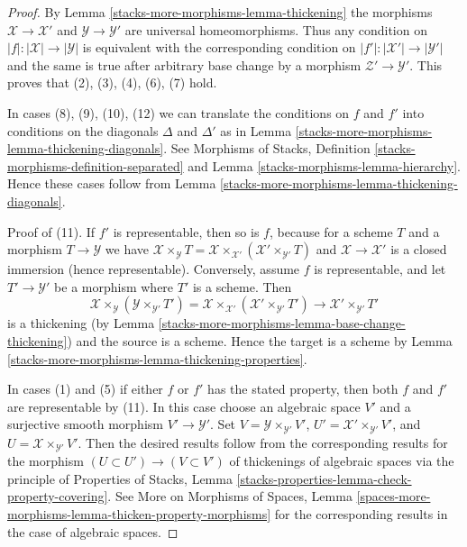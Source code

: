 \begin{proof}
By Lemma \ref{stacks-more-morphisms-lemma-thickening} the morphisms $\mathcal{X} \to \mathcal{X}'$
and $\mathcal{Y} \to \mathcal{Y}'$ are universal homeomorphisms. Thus any
condition on $|f| : |\mathcal{X}| \to |\mathcal{Y}|$ is equivalent with
the corresponding condition on $|f'| : |\mathcal{X}'| \to |\mathcal{Y}'|$
and the same is true after arbitrary base change by a morphism
$\mathcal{Z}' \to \mathcal{Y}'$. This proves that
(2), (3), (4), (6), (7) hold.

\medskip\noindent
In cases (8), (9), (10), (12) we can translate the conditions on
$f$ and $f'$ into conditions on the diagonals $\Delta$ and $\Delta'$
as in Lemma \ref{stacks-more-morphisms-lemma-thickening-diagonals}. See
Morphisms of Stacks, Definition \ref{stacks-morphisms-definition-separated} and
Lemma \ref{stacks-morphisms-lemma-hierarchy}.
Hence these cases follow from Lemma \ref{stacks-more-morphisms-lemma-thickening-diagonals}.

\medskip\noindent
Proof of (11). If $f'$ is representable, then so is $f$, because
for a scheme $T$ and a morphism $T \to \mathcal{Y}$ we have
$\mathcal{X} \times_\mathcal{Y} T =
\mathcal{X} \times_{\mathcal{X}'} (\mathcal{X}' \times_{\mathcal{Y}'} T)$
and $\mathcal{X} \to \mathcal{X}'$ is a closed immersion (hence representable).
Conversely, assume $f$ is representable, and let $T' \to \mathcal{Y}'$
be a morphism where $T'$ is a scheme. Then
$$
\mathcal{X} \times_{\mathcal{Y}}
(\mathcal{Y} \times_{\mathcal{Y}'} T') =
\mathcal{X} \times_{\mathcal{X}'}
(\mathcal{X}' \times_{\mathcal{Y}'} T') \to
\mathcal{X}' \times_{\mathcal{Y}'} T'
$$
is a thickening (by Lemma \ref{stacks-more-morphisms-lemma-base-change-thickening})
and the source is a scheme. Hence the target is a scheme by
Lemma \ref{stacks-more-morphisms-lemma-thickening-properties}.

\medskip\noindent
In cases (1) and (5) if either $f$ or $f'$ has the stated property,
then both $f$ and $f'$ are representable by (11). In this case
choose an algebraic space $V'$ and a surjective smooth morphism
$V' \to \mathcal{Y}'$. Set $V = \mathcal{Y} \times_{\mathcal{Y}'} V'$,
$U' = \mathcal{X}' \times_{\mathcal{Y}'} V'$, and
$U = \mathcal{X} \times_{\mathcal{Y}'} V'$. Then the desired
results follow from the corresponding results for
the morphism $(U \subset U') \to (V \subset V')$ of thickenings
of algebraic spaces via the principle of Properties of Stacks, Lemma
\ref{stacks-properties-lemma-check-property-covering}.
See More on Morphisms of Spaces, Lemma
\ref{spaces-more-morphisms-lemma-thicken-property-morphisms}
for the corresponding results in the case of algebraic spaces.
\end{proof}

